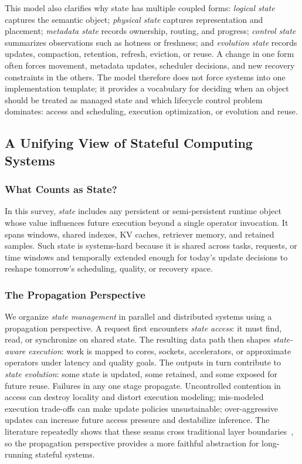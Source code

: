 \documentclass[manuscript,nonacm]{acmart}
\begin{document}
This model also clarifies why state has multiple coupled forms: \emph{logical state} captures the semantic object; \emph{physical state} captures representation and placement; \emph{metadata state} records ownership, routing, and progress; \emph{control state} summarizes observations such as hotness or freshness; and \emph{evolution state} records updates, compaction, retention, refresh, eviction, or reuse. A change in one form often forces movement, metadata updates, scheduler decisions, and new recovery constraints in the others. The model therefore does not force systems into one implementation template; it provides a vocabulary for deciding when an object should be treated as managed state and which lifecycle control problem dominates: access and scheduling, execution optimization, or evolution and reuse.

\subsection{A Unifying View of Stateful Computing Systems}

\subsubsection{What Counts as State?}

In this survey, \emph{state} includes any persistent or semi-persistent runtime object whose value influences future execution beyond a single operator invocation. It spans windows, shared indexes, KV caches, retriever memory, and retained samples. Such state is systems-hard because it is shared across tasks, requests, or time windows and temporally extended enough for today's update decisions to reshape tomorrow's scheduling, quality, or recovery space.

\subsubsection{The Propagation Perspective}

We organize \emph{state management} in parallel and distributed systems using a propagation perspective. A request first encounters \emph{state access}: it must find, read, or synchronize on shared state. The resulting data path then shapes \emph{state-aware execution}: work is mapped to cores, sockets, accelerators, or approximate operators under latency and quality goals. The outputs in turn contribute to \emph{state evolution}: some state is updated, some retained, and some exposed for future reuse. Failures in any one stage propagate. Uncontrolled contention in access can destroy locality and distort execution modeling; mis-modeled execution trade-offs can make update policies unsustainable; over-aggressive updates can increase future access pressure and destabilize inference. The literature repeatedly shows that these seams cross traditional layer boundaries~\cite{zhang2019briskstream,zhang2020concurrent,zeng2024pecj,zhou2025ferret,li2026streamfp,zhang2026flowrag}, so the propagation perspective provides a more faithful abstraction for long-running stateful systems.
\end{document}
